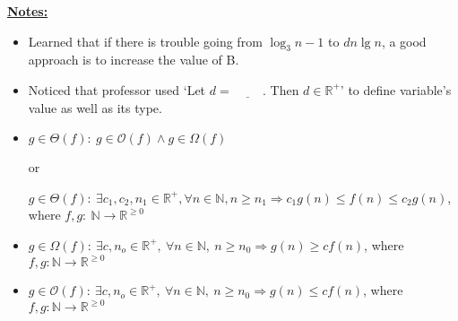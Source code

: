 \documentclass[12pt]{article}
\begin{document}

\bigskip

\underline{\textbf{Notes:}}

\bigskip

\begin{itemize}
    \item Learned that if there is trouble going from $\log_3n - 1$ to $dn\lg n$,
    a good approach is to increase the value of B.
    \item Noticed that professor used `Let $d = \underline{\hspace{1cm}}$. Then $d \in \mathbb{R}^+$'
    to define variable's value as well as its type.
    \item
    $g \in \Theta(f):\: g \in \mathcal{O}(f) \land g \in \Omega(f)$

    or

    $g \in \Theta(f):\:\exists c_1,c_2,n_1 \in \mathbb{R}^{+}, \forall n \in \mathbb{N}, n \geq n_1
    \Rightarrow c_1g(n) \leq f(n) \leq c_2g(n)$, where $f,g:\:\mathbb{N} \to \mathbb{R}^{\geq 0}$

    \item
    $g \in \Omega(f):\:\exists c,n_o \in \mathbb{R}^{+},\:\forall n \in
    \mathbb{N},\:n \geq n_0 \Rightarrow g(n) \geq cf(n)$, where $f,g:\mathbb{N} \to \mathbb{R}^{\geq 0}$

    \item

    $g \in \mathcal{O}(f):\:\exists c,n_o \in \mathbb{R}^{+},\:\forall n \in
    \mathbb{N},\:n \geq n_0 \Rightarrow g(n) \leq cf(n)$, where $f,g:\mathbb{N} \to \mathbb{R}^{\geq 0}$
\end{itemize}
\end{document}
